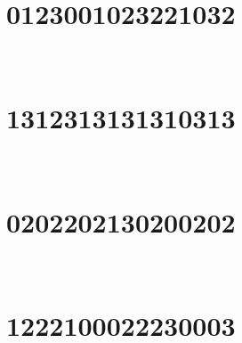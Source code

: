 
\section{0123001023221032}

\marginnote[3\baselineskip]{\centering}



\,
\newline
\vspace{1.2cm}

\section{1312313131310313}

\marginnote[3\baselineskip]{\centering}



\,
\newline
\vspace{1.2cm}

\section{0202202130200202}

\marginnote[3\baselineskip]{\centering}



\,
\newline
\vspace{1.2cm}

\section{1222100022230003}

\marginnote[3\baselineskip]{\centering}



\,
\newline
\vspace{1.2cm}

